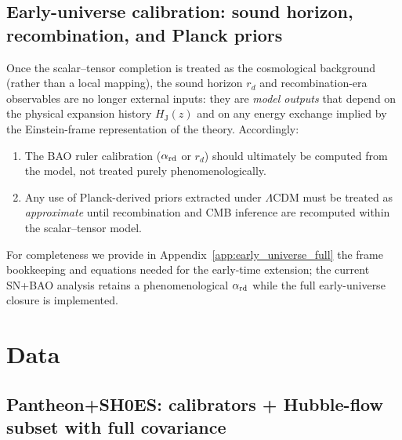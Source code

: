 \documentclass[10pt]{article}
\newcommand{\HJ}{H_{\mathrm{J}}}
\begin{document}
\subsection{Early-universe calibration: sound horizon, recombination, and Planck priors}
\label{sec:constraints_cmb}

Once the scalar--tensor completion is treated as the cosmological background (rather than a local
mapping), the sound horizon \(r_d\) and recombination-era observables are no longer external inputs:
they are \emph{model outputs} that depend on the physical expansion history \(\HJ(z)\) and on any
energy exchange implied by the Einstein-frame representation of the theory. Accordingly:
\begin{enumerate}[leftmargin=1.2em]
\item The BAO ruler calibration (\(\alpha_{\rm rd}\) or \(r_d\)) should ultimately be computed from the
model, not treated purely phenomenologically.
\item Any use of Planck-derived priors extracted under \(\Lambda\)CDM must be treated as \emph{approximate}
until recombination and CMB inference are recomputed within the scalar--tensor model.
\end{enumerate}

For completeness we provide in Appendix~\ref{app:early_universe_full} the frame bookkeeping and
equations needed for the early-time extension; the current SN+BAO analysis retains a phenomenological
\(\alpha_{\rm rd}\) while the full early-universe closure is implemented.


\section{Data}
\label{sec:data}

\subsection{Pantheon+SH0ES: calibrators + Hubble-flow subset with full covariance}
\label{sec:data_sn}
\end{document}
